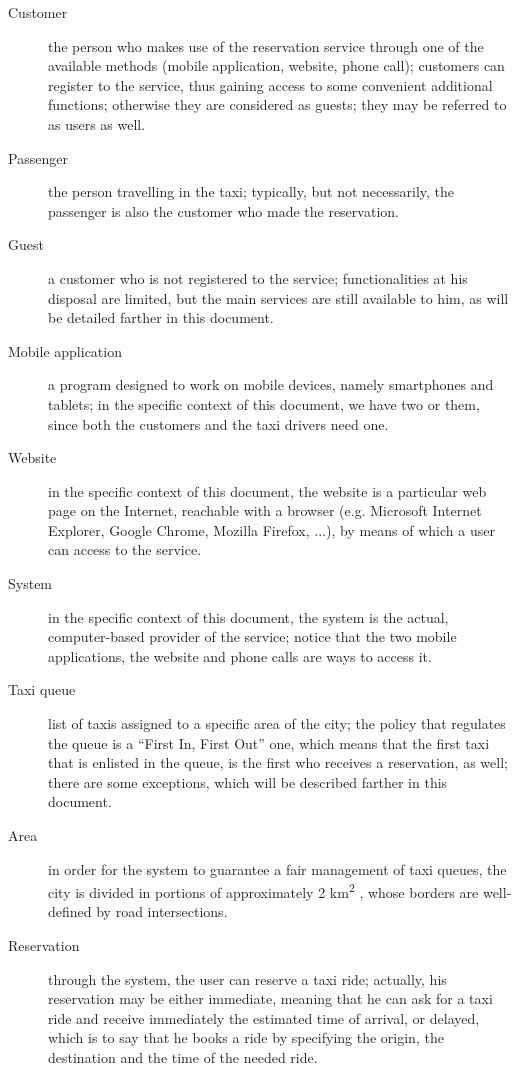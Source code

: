 \begin{description}
	\item [Customer] the person who makes use of the reservation service through one of the available methods (mobile application, website, phone call); customers can register to the service, thus gaining access to some convenient additional functions; otherwise they are considered as guests; they may be referred to as users as well. 
	\item [Passenger] the person travelling in the taxi; typically, but not necessarily, the passenger is also the customer who made the reservation.
	\item [Guest] a customer who is not registered to the service; functionalities at his disposal are limited, but the main services are still available to him, as will be detailed farther in this document.
	\item [Mobile application] a program designed to work on mobile devices, namely smartphones and tablets; in the specific context of this document, we have two or them, since both the customers and the taxi drivers need one.
	\item [Website] in the specific context of this document, the website is a particular web page on the Internet, reachable with a browser (e.g. Microsoft Internet Explorer, Google Chrome, Mozilla Firefox, ...), by means of which a user can access to the service.
	\item [System] in the specific context of this document, the system is the actual, computer-based provider of the service; notice that the two mobile applications, the website and phone calls are ways to access it.  
	\item [Taxi queue] list of taxis assigned to a specific area of the city; the policy that regulates the queue is a ``First In, First Out'' one, which means that the first taxi that is enlisted in the queue, is the first who receives a reservation, as well; there are some exceptions, which will be described farther in this document.
	\item [Area] in order for the system to guarantee a fair management of taxi queues, the city is divided in portions of approximately 2 km\textsuperscript{2} , whose borders are well-defined by road intersections.
	\item [Reservation] through the system, the user can reserve a taxi ride; actually, his reservation may be either immediate, meaning that he can ask for a taxi ride and receive immediately the estimated time of arrival, or delayed, which is to say that he books a ride by specifying the origin, the destination and the time of the needed ride.
\end{description}








